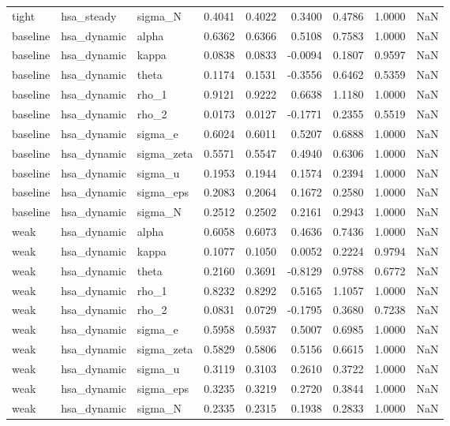 \begin{tabular}{lllrrrrrl}
tight & hsa\_steady & sigma\_N & 0.4041 & 0.4022 & 0.3400 & 0.4786 & 1.0000 & NaN \\
baseline & hsa\_dynamic & alpha & 0.6362 & 0.6366 & 0.5108 & 0.7583 & 1.0000 & NaN \\
baseline & hsa\_dynamic & kappa & 0.0838 & 0.0833 & -0.0094 & 0.1807 & 0.9597 & NaN \\
baseline & hsa\_dynamic & theta & 0.1174 & 0.1531 & -0.3556 & 0.6462 & 0.5359 & NaN \\
baseline & hsa\_dynamic & rho\_1 & 0.9121 & 0.9222 & 0.6638 & 1.1180 & 1.0000 & NaN \\
baseline & hsa\_dynamic & rho\_2 & 0.0173 & 0.0127 & -0.1771 & 0.2355 & 0.5519 & NaN \\
baseline & hsa\_dynamic & sigma\_e & 0.6024 & 0.6011 & 0.5207 & 0.6888 & 1.0000 & NaN \\
baseline & hsa\_dynamic & sigma\_zeta & 0.5571 & 0.5547 & 0.4940 & 0.6306 & 1.0000 & NaN \\
baseline & hsa\_dynamic & sigma\_u & 0.1953 & 0.1944 & 0.1574 & 0.2394 & 1.0000 & NaN \\
baseline & hsa\_dynamic & sigma\_eps & 0.2083 & 0.2064 & 0.1672 & 0.2580 & 1.0000 & NaN \\
baseline & hsa\_dynamic & sigma\_N & 0.2512 & 0.2502 & 0.2161 & 0.2943 & 1.0000 & NaN \\
weak & hsa\_dynamic & alpha & 0.6058 & 0.6073 & 0.4636 & 0.7436 & 1.0000 & NaN \\
weak & hsa\_dynamic & kappa & 0.1077 & 0.1050 & 0.0052 & 0.2224 & 0.9794 & NaN \\
weak & hsa\_dynamic & theta & 0.2160 & 0.3691 & -0.8129 & 0.9788 & 0.6772 & NaN \\
weak & hsa\_dynamic & rho\_1 & 0.8232 & 0.8292 & 0.5165 & 1.1057 & 1.0000 & NaN \\
weak & hsa\_dynamic & rho\_2 & 0.0831 & 0.0729 & -0.1795 & 0.3680 & 0.7238 & NaN \\
weak & hsa\_dynamic & sigma\_e & 0.5958 & 0.5937 & 0.5007 & 0.6985 & 1.0000 & NaN \\
weak & hsa\_dynamic & sigma\_zeta & 0.5829 & 0.5806 & 0.5156 & 0.6615 & 1.0000 & NaN \\
weak & hsa\_dynamic & sigma\_u & 0.3119 & 0.3103 & 0.2610 & 0.3722 & 1.0000 & NaN \\
weak & hsa\_dynamic & sigma\_eps & 0.3235 & 0.3219 & 0.2720 & 0.3844 & 1.0000 & NaN \\
weak & hsa\_dynamic & sigma\_N & 0.2335 & 0.2315 & 0.1938 & 0.2833 & 1.0000 & NaN \\

\end{tabular}

